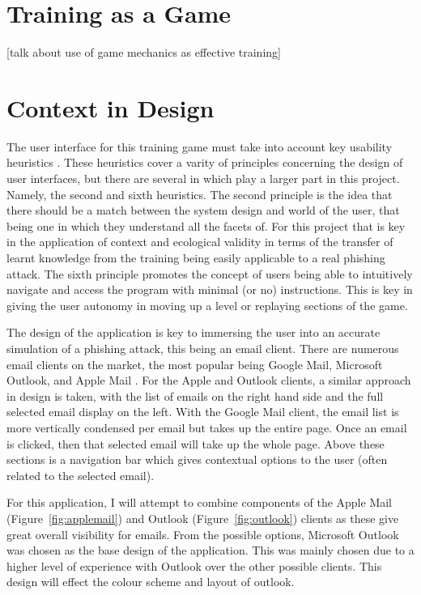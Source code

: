 \documentclass{l4proj}
\begin{document}
\section{Training as a Game}
[talk about use of game mechanics as effective training]

\section{Context in Design}
The user interface for this training game must take into account key usability heuristics \citep{nielsen2005ten}. These heuristics cover a varity of principles concerning the design of user interfaces, but there are several in which play a larger part in this project. Namely, the second and sixth heuristics. The second principle is the idea that there should be a match between the system design and world of the user, that being one in which they understand all the facets of. For this project that is key in the application of context and ecological validity in terms of the transfer of learnt knowledge from the training being easily applicable to a real phishing attack. The sixth principle promotes the concept of users being able to intuitively navigate and access the program with minimal (or no) instructions. This is key in giving the user autonomy in moving up a level or replaying sections of the game.

The design of the application is key to immersing the user into an accurate simulation of a phishing attack, this being an email client. There are numerous email clients on the market, the most popular being Google Mail, Microsoft Outlook, and Apple Mail \citep{emailclientlitmus}. For the Apple and Outlook clients, a similar approach in design is taken, with the list of emails on the right hand side and the full selected email display on the left. With the Google Mail client, the email list is more vertically condensed per email but takes up the entire page. Once an email is clicked, then that selected email will take up the whole page. Above these sections is a navigation bar which gives contextual options to the user (often related to the selected email). 

For this application, I will attempt to combine components of the Apple Mail (Figure~\ref{fig:applemail}) and Outlook (Figure~\ref{fig:outlook}) clients as these give great overall visibility for emails. From the possible options, Microsoft Outlook was chosen as the base design of the application. This was mainly chosen due to a higher level of experience with Outlook over the other possible clients. This design will effect the colour scheme and layout of outlook.
\end{document}
